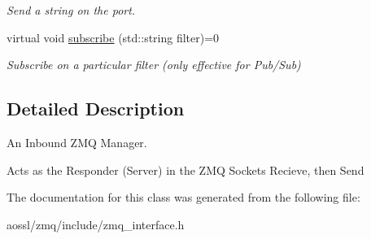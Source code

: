 \begin{DoxyCompactItemize}
\begin{DoxyCompactList}\small\item\em Send a string on the port. \end{DoxyCompactList}\item 
virtual void \hyperlink{classZmqIn_a1b7ed3f43e1796a5a0cdd090f69ae932}{subscribe} (std\+::string filter)=0\hypertarget{classZmqIn_a1b7ed3f43e1796a5a0cdd090f69ae932}{}\label{classZmqIn_a1b7ed3f43e1796a5a0cdd090f69ae932}

\begin{DoxyCompactList}\small\item\em Subscribe on a particular filter (only effective for Pub/\+Sub) \end{DoxyCompactList}\end{DoxyCompactItemize}


\subsection{Detailed Description}
An Inbound Z\+MQ Manager. 

Acts as the Responder (Server) in the Z\+MQ Sockets Recieve, then Send 

The documentation for this class was generated from the following file\+:\begin{DoxyCompactItemize}
\item 
aossl/zmq/include/zmq\+\_\+interface.\+h\end{DoxyCompactItemize}
